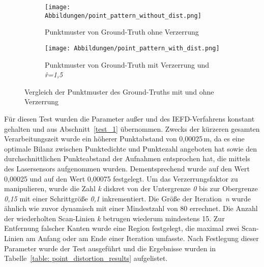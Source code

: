 \begin{figure}[b]
	\centering
	\begin{subfigure}{0.49\textwidth}
		\texttt{[image: Abbildungen/point\_pattern\_without\_dist.png]}
		\centering
		\caption{Punktmuster von Ground-Truth ohne Verzerrung}
		\label{fig: point_pattern_without_dist}
	\end{subfigure}
	\hfill
	\begin{subfigure}{0.49\textwidth}
		\texttt{[image: Abbildungen/point\_pattern\_with\_dist.png]}
		\centering
		\caption{Punktmuster von Ground-Truth mit Verzerrung und \textit{\^{r}=1,5}}
		\label{fig: point_patter_with_dist}
	\end{subfigure}
	\caption[Effekt des Rauschens auf die Ground-Truth Datei]{Vergleich der Punktmuster des Ground-Truths mit und ohne Verzerrung}
	\label{fig: point_pattern_comparision}
\end{figure}

Für diesen Test wurden die Parameter außer \distthresha und \distthreshb des IEFD-Verfahrens konstant gehalten und aus Abschnitt~\ref{test_1} übernommen. Zwecks der kürzeren gesamten Verarbeitungszeit wurde ein höherer Punktabstand von 0,00025\,\si{\m}, da es eine optimale Bilanz zwischen Punktedichte und Punktezahl angeboten hat sowie den durchschnittlichen Punkteabstand der Aufnahmen entsprochen hat, die mittels des Lasersensors aufgenommen wurden. Dementsprechend wurde \distthresha auf den Wert 0,00025 und \distthreshb auf den Wert 0,00075 festgelegt. Um das Verzerrungsfaktor zu manipulieren, wurde die Zahl \textit{k} diskret von der Untergrenze \textit{0} bis zur Obergrenze \textit{0,15} mit einer Schrittgröße \textit{0,1} inkrementiert. Die Größe der Iteration~\textit{n} wurde ähnlich wie zuvor dynamisch mit einer Mindestzahl von 80 errechnet. Die Anzahl der wiederholten Scan-Linien \textit{k} betrugen wiederum mindestens 15. Zur Entfernung falscher Kanten wurde eine Region festgelegt, die maximal zwei Scan-Linien am Anfang oder am Ende einer Iteration umfasste. Nach Festlegung dieser Parameter wurde der Test ausgeführt und die Ergebnisse wurden in Tabelle~\ref{table: point_distortion_results} aufgelistet.

